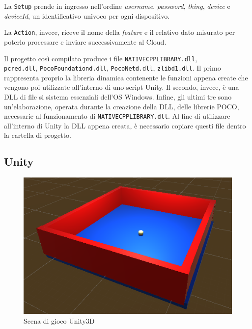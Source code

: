 La \texttt{Setup} prende in ingresso nell'ordine \textit{username}, \textit{password}, \textit{thing}, \textit{device}  e \textit{deviceId}, un identificativo univoco per ogni dispositivo.

La \texttt{Action}, invece, riceve il nome della \textit{feature} e il relativo dato misurato per poterlo processare e inviare successivamente al Cloud.

Il progetto così compilato produce i file \texttt{NATIVECPPLIBRARY.dll}, \\\texttt{pcred.dll}, \texttt{PocoFoundationd.dll}, \texttt{PocoNetd.dll}, \texttt{zlibd1.dll}. Il primo rappresenta proprio la libreria dinamica contenente le funzioni appena create che vengono poi utilizzate all'interno di uno script Unity. Il secondo, invece, è una DLL di file si sistema essenziali dell'OS Windows. Infine, gli ultimi tre sono un’elaborazione, operata durante la creazione della DLL, delle librerie POCO, necessarie al funzionamento di  \texttt{NATIVECPPLIBRARY.dll}. Al fine di utilizzare all'interno di Unity la DLL appena creata, è necessario copiare questi file dentro la cartella di progetto.
\subsection{Unity}

\begin{figure}[H]
	\centering
	\includegraphics[scale=1.1]{pics/ring}
	\caption{Scena di gioco Unity3D}
	\label{ring}
\end{figure}

